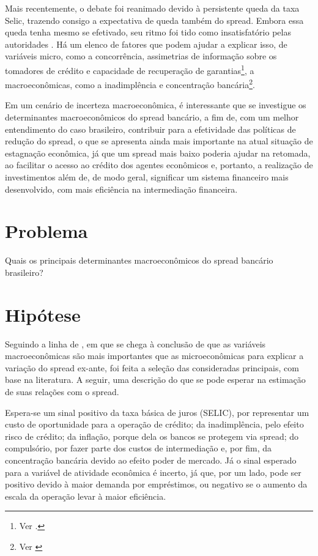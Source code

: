 \documentclass[a4paper, article, 12pt, openany, oneside, english, brazil]{abntex2}
\begin{document}
    Mais recentemente, o debate foi reanimado devido à persistente queda da taxa Selic, trazendo consigo a expectativa de queda também do spread. Embora essa queda tenha mesmo se efetivado, seu ritmo foi tido como insatisfatório pelas autoridades \cite{valor1}. Há um elenco de fatores que podem ajudar a explicar isso, de variáveis micro, como a concorrência, assimetrias de informação sobre os tomadores de crédito e capacidade de recuperação de garantias\footnote{Ver \cite[p.~13]{reb2018}.}, a macroeconômicas, como a inadimplência e concentração bancária\footnote{Ver \cite{valor2}}.
    
    Em um cenário de incerteza macroeconômica, é interessante que se investigue os determinantes macroeconômicos do spread bancário, a fim de, com um melhor entendimento do caso brasileiro, contribuir para a efetividade das políticas de redução do spread, o que se apresenta ainda mais importante na atual situação de estagnação econômica, já que um spread mais baixo poderia ajudar na retomada, ao facilitar o acesso ao crédito dos agentes econômicos e, portanto, a realização de investimentos \cite[p.~8]{manhica12} além de, de modo geral, significar um sistema financeiro mais desenvolvido, com mais eficiência na intermediação financeira.


\section{Problema}

    Quais os principais determinantes macroeconômicos do spread bancário brasileiro?

\section{Hipótese}
    
    Seguindo a linha de , em que se chega à conclusão de que as variáveis macroeconômicas são mais importantes que as microeconômicas para explicar a variação do spread ex-ante, foi feita a seleção das consideradas principais, com base na literatura. A seguir, uma descrição do que se pode esperar na estimação de suas relações com o spread.

    Espera-se um sinal positivo da taxa básica de juros (SELIC), por representar um custo de oportunidade para a operação de crédito; da inadimplência, pelo efeito risco de crédito; da inflação, porque dela os bancos se protegem via spread; do compulsório, por fazer parte dos custos de intermediação e, por fim, da concentração bancária devido ao efeito poder de mercado. Já o sinal esperado para a variável de atividade econômica é incerto, já que, por um lado, pode ser positivo devido à maior demanda por empréstimos, ou negativo se o aumento da escala da operação levar à maior eficiência.
\end{document}
